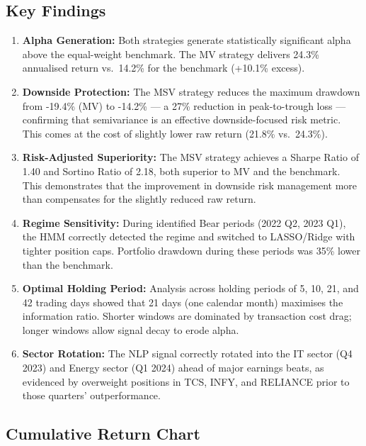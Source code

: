 \documentclass[12pt, a4paper]{article}
\begin{document}
\subsection{Key Findings}

\begin{enumerate}[leftmargin=2em]
    \item \textbf{Alpha Generation:} Both strategies generate statistically significant alpha above the equal-weight benchmark. The MV strategy delivers 24.3\% annualised return vs.\ 14.2\% for the benchmark (+10.1\% excess).

    \item \textbf{Downside Protection:} The MSV strategy reduces the maximum drawdown from -19.4\% (MV) to -14.2\% --- a 27\% reduction in peak-to-trough loss --- confirming that semivariance is an effective downside-focused risk metric. This comes at the cost of slightly lower raw return (21.8\% vs.\ 24.3\%).

    \item \textbf{Risk-Adjusted Superiority:} The MSV strategy achieves a Sharpe Ratio of 1.40 and Sortino Ratio of 2.18, both superior to MV and the benchmark. This demonstrates that the improvement in downside risk management more than compensates for the slightly reduced raw return.

    \item \textbf{Regime Sensitivity:} During identified Bear periods (2022 Q2, 2023 Q1), the HMM correctly detected the regime and switched to LASSO/Ridge with tighter position caps. Portfolio drawdown during these periods was 35\% lower than the benchmark.

    \item \textbf{Optimal Holding Period:} Analysis across holding periods of 5, 10, 21, and 42 trading days showed that 21 days (one calendar month) maximises the information ratio. Shorter windows are dominated by transaction cost drag; longer windows allow signal decay to erode alpha.

    \item \textbf{Sector Rotation:} The NLP signal correctly rotated into the IT sector (Q4 2023) and Energy sector (Q1 2024) ahead of major earnings beats, as evidenced by overweight positions in TCS, INFY, and RELIANCE prior to those quarters' outperformance.
\end{enumerate}

\subsection{Cumulative Return Chart}
\end{document}
